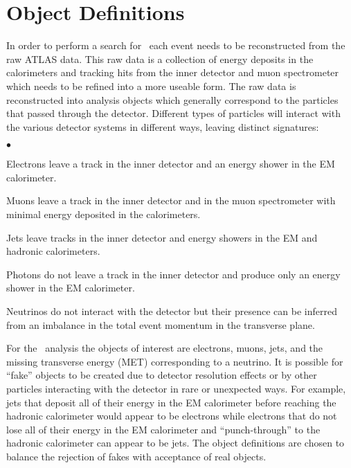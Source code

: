 \chapter{Object Definitions}
\label{SECTION-OBJ}
In order to perform a search for \Wprimechan\ each event needs to be reconstructed from the raw ATLAS data. This raw data is a collection of energy deposits in the calorimeters and tracking hits from the inner detector and muon spectrometer which needs to be refined into a more useable form. The raw data is reconstructed into analysis objects which generally correspond to the particles that passed through the detector. Different types of particles will interact with the various detector systems in different ways, leaving distinct signatures:

\begin{list}{$\bullet$}{}
\item Electrons leave a track in the inner detector and an energy shower in the EM calorimeter. 
\item Muons leave a track in the inner detector and in the muon spectrometer with minimal energy deposited in the calorimeters.
\item Jets leave tracks in the inner detector and energy showers in the EM and hadronic calorimeters.
\item Photons do not leave a track in the inner detector and produce only an energy shower in the EM calorimeter.
\item Neutrinos do not interact with the detector but their presence can be inferred from an imbalance in the total event momentum in the transverse plane.
\end{list}

\noindent
For the \Wprimechan\ analysis the objects of interest are electrons, muons, jets, and the missing transverse energy (MET) corresponding to a neutrino. It is possible for ``fake'' objects to be created due to detector resolution effects or by other particles interacting with the detector in rare or unexpected ways. For example, jets that deposit all of their energy in the EM calorimeter before reaching the hadronic calorimeter would appear to be electrons while electrons that do not lose all of their energy in the EM calorimeter and ``punch-through'' to the hadronic calorimeter can appear to be jets. The object definitions are chosen to balance the rejection of fakes with acceptance of real objects.

